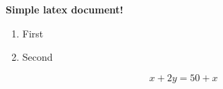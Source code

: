 \documentclass{article}
\begin{document}
\textbf{Simple latex document!}


\begin{enumerate}
  \item First
  \item Second
\end{enumerate}

\begin{equation}
	x+2y=50+x
\end{equation}
\end{document}
